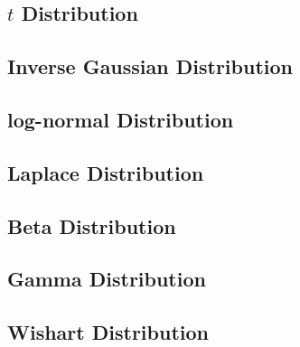 \subsection{$t$ Distribution}
\subsection{Inverse Gaussian Distribution}
\subsection{log-normal Distribution}
\subsection{Laplace Distribution}
\subsection{Beta Distribution}
\subsection{Gamma Distribution}
\subsection{Wishart Distribution}
